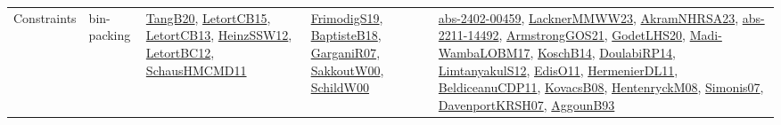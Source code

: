 {\begin{longtable}{lp{3cm}>{\raggedright}p{6cm}>{\raggedright}p{6cm}p{8cm}}
Constraints & bin-packing & \href{papers/TangB20.pdf}{TangB20}\cite{TangB20}, \href{articles/LetortCB15.pdf}{LetortCB15}\cite{LetortCB15}, \href{papers/LetortCB13.pdf}{LetortCB13}\cite{LetortCB13}, \href{articles/HeinzSSW12.pdf}{HeinzSSW12}\cite{HeinzSSW12}, \href{papers/LetortBC12.pdf}{LetortBC12}\cite{LetortBC12}, \href{articles/SchausHMCMD11.pdf}{SchausHMCMD11}\cite{SchausHMCMD11} & \href{papers/FrimodigS19.pdf}{FrimodigS19}\cite{FrimodigS19}, \href{articles/BaptisteB18.pdf}{BaptisteB18}\cite{BaptisteB18}, \href{papers/GarganiR07.pdf}{GarganiR07}\cite{GarganiR07}, \href{articles/SakkoutW00.pdf}{SakkoutW00}\cite{SakkoutW00}, \href{articles/SchildW00.pdf}{SchildW00}\cite{SchildW00} & \href{articles/abs-2402-00459.pdf}{abs-2402-00459}\cite{abs-2402-00459}, \href{articles/LacknerMMWW23.pdf}{LacknerMMWW23}\cite{LacknerMMWW23}, \href{articles/AkramNHRSA23.pdf}{AkramNHRSA23}\cite{AkramNHRSA23}, \href{articles/abs-2211-14492.pdf}{abs-2211-14492}\cite{abs-2211-14492}, \href{papers/ArmstrongGOS21.pdf}{ArmstrongGOS21}\cite{ArmstrongGOS21}, \href{papers/GodetLHS20.pdf}{GodetLHS20}\cite{GodetLHS20}, \href{papers/Madi-WambaLOBM17.pdf}{Madi-WambaLOBM17}\cite{Madi-WambaLOBM17}, \href{papers/KoschB14.pdf}{KoschB14}\cite{KoschB14}, \href{papers/DoulabiRP14.pdf}{DoulabiRP14}\cite{DoulabiRP14}, \href{articles/LimtanyakulS12.pdf}{LimtanyakulS12}\cite{LimtanyakulS12}, \href{papers/EdisO11.pdf}{EdisO11}\cite{EdisO11}, \href{papers/HermenierDL11.pdf}{HermenierDL11}\cite{HermenierDL11}, \href{articles/BeldiceanuCDP11.pdf}{BeldiceanuCDP11}\cite{BeldiceanuCDP11}, \href{articles/KovacsB08.pdf}{KovacsB08}\cite{KovacsB08}, \href{papers/HentenryckM08.pdf}{HentenryckM08}\cite{HentenryckM08}, \href{articles/Simonis07.pdf}{Simonis07}\cite{Simonis07}, \href{papers/DavenportKRSH07.pdf}{DavenportKRSH07}\cite{DavenportKRSH07}, \href{articles/AggounB93.pdf}{AggounB93}\cite{AggounB93}\\

\end{longtable}}
